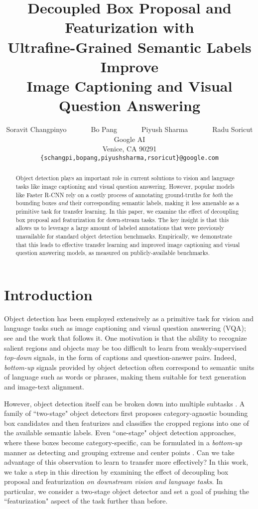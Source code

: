 \documentclass[11pt,a4paper]{article}
\title{Decoupled Box Proposal and Featurization with \\Ultrafine-Grained Semantic Labels Improve \\Image Captioning and Visual Question Answering}
\author{Soravit Changpinyo~~~~~~~Bo Pang~~~~~~~Piyush Sharma~~~~~~~Radu Soricut\\
  Google AI \\
  Venice, CA 90291 \\
  {\tt \{schangpi,bopang,piyushsharma,rsoricut\}@google.com} \\
  }
\date{}
\begin{document}
\maketitle

\begin{abstract}
 Object detection plays an important role in current solutions to vision and language tasks like image captioning and visual question answering.  However, popular models like Faster R-CNN rely on a costly process of annotating ground-truths for {\em both} the bounding boxes {\em and} their corresponding semantic labels, making it less amenable as a primitive task for transfer learning. In this paper, we examine the effect of decoupling box proposal and featurization for down-stream tasks. The key insight is that this allows us to leverage a large amount of labeled annotations that were previously unavailable for standard object detection benchmarks. Empirically, we demonstrate that this leads to effective transfer learning and improved image captioning and visual question answering models, as measured on publicly-available benchmarks.
 \end{abstract}

\section{Introduction}

Object detection has been employed extensively as a primitive task for vision and language tasks such as image captioning and visual question answering (VQA); see \cite{anderson18bottomup} and the work that follows it.
One motivation is that the ability to recognize salient regions and objects may be too difficult to learn from weakly-supervised \emph{top-down} signals, in the form of captions and question-answer pairs.
Indeed, \emph{bottom-up} signals provided by object detection often correspond to semantic units of language such as words or phrases, making them suitable for text generation and image-text alignment.

However, object detection itself can be broken down into multiple subtasks \cite{liu18deep}.
A family of ``two-stage" object detectors first proposes category-agnostic bounding box candidates and then featurizes and classifies the cropped regions into one of the available semantic labels.
Even ``one-stage" object detection approaches, where these boxes become category-specific, can be formulated in a \emph{bottom-up} manner as detecting and grouping extreme and center points \cite{zhou19bottom}.
Can we take advantage of this observation to learn to transfer more effectively?
In this work, we take a step in this direction by examining the effect of decoupling box proposal and featurization \emph{on downstream vision and language tasks}.
In particular, we consider a two-stage object detector and set a goal of pushing the ``featurization" aspect of the task further than before.
\end{document}
